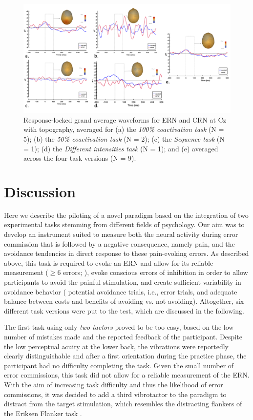 \documentclass[twocolumn, serif, authordate, empirical]{jote-article}
\begin{document}
\begin{figure}
    \centering
    \includegraphics[width=\textwidth]{articles/empirical/traxler/figure3.png}
    \caption{Response-locked grand average waveforms for ERN and CRN at Cz with topography, averaged for (a) the \emph{100\% coactivation task} (N = 5); (b) the \emph{50\% coactivation task} (N = 2); (c) the \emph{Sequence task} (N = 1); (d) the \emph{Different intensities task}
(N = 1); and (e) averaged across the four task versions (N = 9).}
    \label{fig:3}
\end{figure}


 {}\section*{Discussion} 

Here we describe the piloting of a novel paradigm based on the integration of two experimental tasks stemming from different fields of psychology. Our aim was to develop an instrument suited to measure both the neural activity during error commission that is followed by a negative consequence, namely pain, and the avoidance tendencies in direct response to these pain-evoking errors. As described above, this task is required to evoke an ERN and allow for its reliable measurement ($\geq 6$ errors; ), evoke conscious errors of inhibition in order to allow participants to avoid the painful stimulation, and create sufficient variability in avoidance behavior ( potential avoidance trials, i.e., error trials, and adequate balance between costs and benefits of avoiding vs. not avoiding). Altogether, six different task versions were put to the test, which are discussed in the following.

The first task using only \emph{two tactors} proved to be too easy, based on the low number of mistakes made and the reported feedback of the participant. Despite the low perceptual acuity at the lower back, the vibrations were reportedly clearly distinguishable and after a first orientation during the practice phase, the participant had no difficulty completing the task. Given the small number of error commissions, this task did not allow for a reliable measurement of the ERN. With the aim of increasing task difficulty and thus the likelihood of error commissions, it was decided to add a third vibrotactor to the paradigm to distract from the target stimulation, which resembles the distracting flankers of the Eriksen Flanker task \parencite{Eriksen1974}.~
\end{document}
